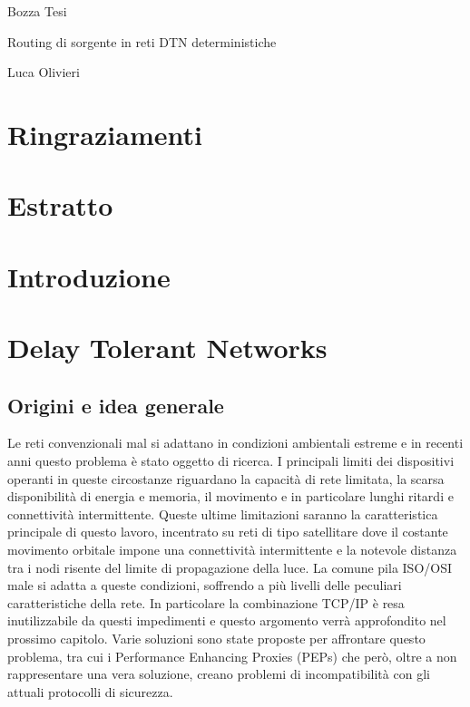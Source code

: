 \documentclass[a4paper]{article}
\begin{document}
	
	\centerline{\sc Bozza Tesi}
	\centerline{\sc \large Routing di sorgente in reti DTN deterministiche}
	\centerline{\sc Luca Olivieri}
	\vspace{2pc}
	
	\clearpage
	
	\section*{Ringraziamenti}	
	
	\clearpage
	
	\section*{Estratto}
	
	\clearpage
	
	\tableofcontents
	
	\clearpage
	
	\section{Introduzione}
	
	\clearpage
	
	\section{Delay Tolerant Networks}
		
		\subsection{Origini e idea generale}
		
		Le reti convenzionali mal si adattano in condizioni ambientali estreme e in recenti anni questo problema è stato oggetto di ricerca. I principali limiti dei dispositivi operanti in queste circostanze riguardano la capacità di rete limitata, la scarsa disponibilità di energia e memoria, il movimento e in particolare lunghi ritardi e connettività intermittente. Queste ultime limitazioni saranno la caratteristica principale di questo lavoro, incentrato su reti di tipo satellitare dove il costante movimento orbitale impone una connettività intermittente e la notevole distanza tra i nodi risente del limite di propagazione della luce. La comune pila ISO/OSI male si adatta a queste condizioni, soffrendo a più livelli delle peculiari caratteristiche della rete. In particolare la combinazione TCP/IP è resa inutilizzabile da questi impedimenti e questo argomento verrà approfondito nel prossimo capitolo. Varie soluzioni sono state proposte per affrontare questo problema, tra cui i Performance Enhancing Proxies (PEPs) che però, oltre a non rappresentare una vera soluzione, creano problemi di incompatibilità con gli attuali protocolli di sicurezza.
		
\end{document}
